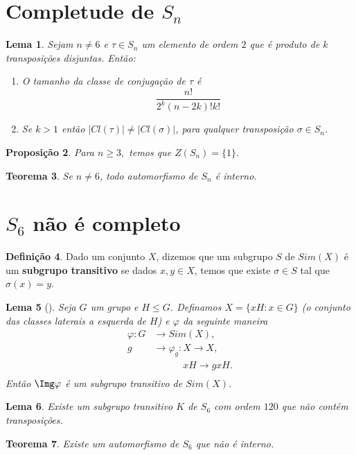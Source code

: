 \documentclass{article}
\newtheorem{theorem}{Teorema}[section]
\newtheorem{lemma}[theorem]{Lema}
\newtheorem{proposition}[theorem]{Proposição}
\theoremstyle{definition}
\newtheorem{definition}[theorem]{Definição}
\theoremstyle{remark}
\begin{document}
\section{Completude de $S_n$}
\begin{lemma}
      Sejam $n\neq 6$ e $\tau \in S_n$ um elemento de ordem $2$ que é produto de $k$ transposições disjuntas. Então:

    \begin{enumerate}
        \item O tamanho da classe de conjugação de $\tau$ é
        $$\frac{n!}{2^k(n-2k)!k!}$$

        \item Se $k>1$ então $\vert Cl(\tau)\vert \neq \vert Cl(\sigma)\vert$, para qualquer transposição $\sigma \in S_n$.
\end{enumerate}
\end{lemma}
   
\begin{proposition}
     Para $n\geq 3,$ temos que $Z(S_n)=\{1\}.$
\end{proposition}

\begin{theorem}
        Se $n \neq 6$, todo automorfismo de $S_n$ é interno.
\end{theorem}
\section{$S_6$ não é completo}
\begin{definition}
  Dado um conjunto $X$, dizemos que um subgrupo $S$ de $Sim(X)$ é um \textbf{subgrupo transitivo} se dados $x,y\in X$, temos que existe $\sigma\in S$ tal que $\sigma(x)=y$.     
\end{definition}
\begin{lemma}[]
  Seja $G$ um grupo e $H\leq G$. Definamos $X=\{xH:x\in G\}$ (o conjunto das classes laterais a esquerda de $H$) e $\varphi$ da seguinte maneira
  \begin{align*}
    \varphi:G&\to Sim(X),\\
            g&\to \varphi_g:X\to X,\\
  \phantom{g}&\phantom{\to \varphi_g:}xH\to gxH.
  \end{align*}
  Então $\Img \varphi$ é um subgrupo transitivo de $Sim(X)$.
\end{lemma}
\begin{lemma}
      Existe um subgrupo transitivo $K$ de $S_6$ com ordem $120$ que não contém transposições. 
\end{lemma}
\begin{theorem}
       Existe um automorfismo de $S_6$ que não é interno.     
\end{theorem}
\end{document}
